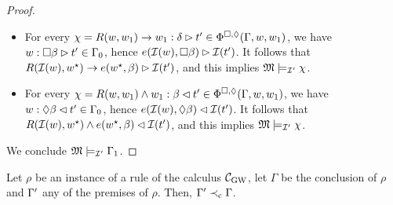 \begin{proof}
\begin{itemize}
  \item For every $\chi=R(w,w_1)\to w_1 : \delta \rhd
    t'\in\Phi^{\Box,\lozenge}(\Gamma,w,w_1)$, we have $w : \Box \beta \rhd t'\in \Gamma_0$,
    hence $e(\mathcal{I}(w),\Box \beta) \rhd \mathcal{I}(t')$.  %
    It follows that $R(\mathcal{I}(w),w^\star)\to e(w^\star,\beta)\rhd
    \mathcal{I}(t')$, and this implies $\mathfrak{M}\models_{\mathcal{I}'} \chi$.

  \item For every $\chi=R(w,w_1)\wedge w_1 : \beta \lhd
    t'\in\Phi^{\Box,\lozenge}(\Gamma,w,w_1)$, we have $w : \lozenge \beta \lhd t'\in \Gamma_0$,
    hence $e(\mathcal{I}(w),\lozenge \beta) \lhd
    \mathcal{I}(t')$. %
    It follows that $R(\mathcal{I}(w),w^\star)\land
    e(w^\star,\beta)\lhd\mathcal{I}(t')$, and this implies $\mathfrak{M}\models_{\mathcal{I}'}
    \chi$.
  \end{itemize}
  We conclude $\mathfrak{M}\models_{\mathcal{I}'} \Gamma_1$.  
\end{proof}
  
  
\begin{lemma}\label{lemma:rulesDec}
  Let $\rho$ be an instance of a rule of the calculus $\mathcal{C}_{\mathrm{GW}}$, let
  $\Gamma$ be the conclusion of $\rho$ and  $\Gamma'$ any of the premises of $\rho$.
  Then,  $\Gamma'\prec_{\mathrm{c}} \Gamma$.
\end{lemma}

